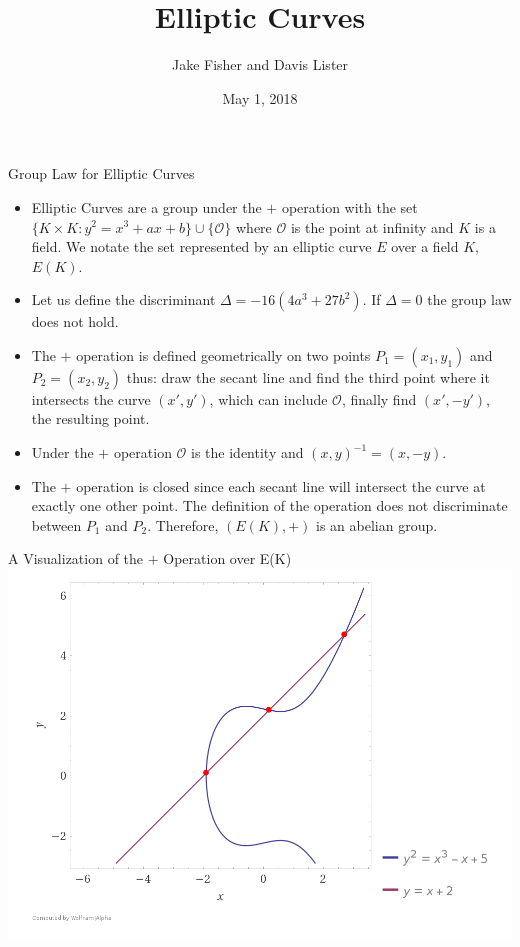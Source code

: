 \documentclass{beamer}
\title{Elliptic Curves}
\author{Jake Fisher and Davis Lister}
\date{May 1, 2018}
\begin{document}
	
	\begin{frame}
		\titlepage
	\end{frame}
	
		\begin{frame}{Group Law for Elliptic Curves}
		\begin{itemize}
			\item Elliptic Curves are a group under the $+$ operation with the set $\lbrace K \times K: y^2=x^3+ax+b \rbrace \cup \lbrace \mathcal{O} \rbrace$ where $\mathcal{O}$ is the point at infinity and $K$ is a field. We notate the set represented by an elliptic curve $E$ over a field $K$, $E(K)$.
			\item Let us define the discriminant $\Delta = -16(4a^3+27b^2)$. If $\Delta = 0$ the group law does not hold.
			\item The $+$ operation is defined geometrically on two points $P_1=(x_1,y_1)$ and $P_2=(x_2,y_2)$ thus: draw the secant line and find the third point where it intersects the curve $(x',y')$, which can include $\mathcal{O}$, finally find $(x',-y')$, the resulting point.
			\item Under the $+$ operation $\mathcal{O}$ is the identity and $(x,y)^{-1}=(x,-y)$.
			\item The $+$ operation is closed since each secant line will intersect the curve at exactly one other point. The definition of the operation does not discriminate between $P_1$ and $P_2.$ Therefore, $(E(K),+)$ is an abelian group.
		\end{itemize}
	\end{frame}
	
	\begin{frame}{A Visualization of the $+$ Operation over E(K)}
		\includegraphics[scale=.3]{GeometricGroup.png}
	\end{frame} 
	
\end{document}
